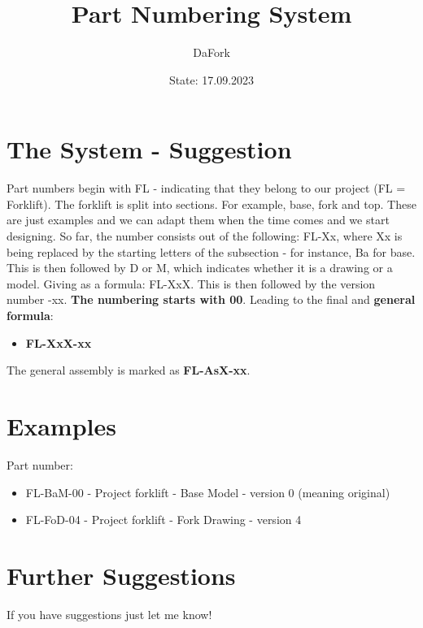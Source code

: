 \documentclass{article}
\title{Part Numbering System}
\author{DaFork}
\date{State: 17.09.2023}
\begin{document}
    \maketitle
    
    \section*{The System - Suggestion}
    Part numbers begin with FL - indicating that they belong to our project (FL = Forklift). 
    The forklift is split into sections. For example, base, fork and top. These are just
    examples and we can adapt them when the time comes and we start designing.
    So far, the number consists out of the following: FL-Xx, where Xx is being replaced by the starting
    letters of the subsection - for instance, Ba for base. This is then followed by D or M, which indicates
    whether it is a drawing or a model. Giving as a formula:
    FL-XxX. This is then followed by the version number -xx. \textbf{The numbering starts with 00}. Leading to the final 
    and \textbf{general formula}:

    \begin{itemize}
        \item \textbf{FL-XxX-xx}
    \end{itemize}

    The general assembly is marked as \textbf{FL-AsX-xx}.

    \section{Examples}
    Part number: 
    \begin{itemize}
        \item FL-BaM-00 - Project forklift - Base Model - version 0 (meaning original)
        \item FL-FoD-04 - Project forklift - Fork Drawing - version 4
    \end{itemize}

    \section*{Further Suggestions}
    If you have suggestions just let me know!    
\end{document}
